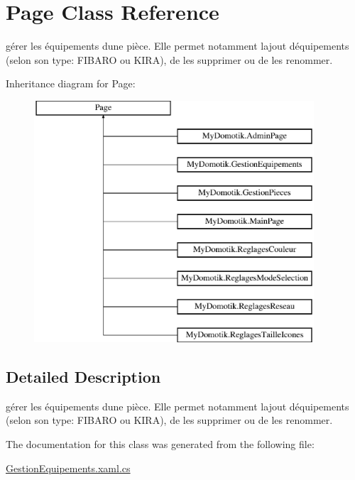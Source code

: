 \hypertarget{class_page}{}\section{Page Class Reference}
\label{class_page}


gérer les équipements d\textquotesingle{}une pièce. Elle permet notamment l\textquotesingle{}ajout d\textquotesingle{}équipements (selon son type\+: F\+I\+B\+A\+RO ou K\+I\+RA), de les supprimer ou de les renommer.  


Inheritance diagram for Page\+:\begin{figure}[H]
\begin{center}
\leavevmode
\includegraphics[height=9.000000cm]{class_page}
\end{center}
\end{figure}


\subsection{Detailed Description}
gérer les équipements d\textquotesingle{}une pièce. Elle permet notamment l\textquotesingle{}ajout d\textquotesingle{}équipements (selon son type\+: F\+I\+B\+A\+RO ou K\+I\+RA), de les supprimer ou de les renommer. 

The documentation for this class was generated from the following file\+:\begin{DoxyCompactItemize}
\item 
\hyperlink{_gestion_equipements_8xaml_8cs}{Gestion\+Equipements.\+xaml.\+cs}\end{DoxyCompactItemize}
